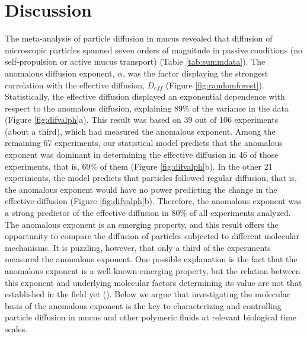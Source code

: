 \documentclass[aps,prl,preprint,superscriptaddress,showkeys,linenumbers]{revtex4-1}
\begin{document}
\section*{Discussion}
The meta-analysis of particle diffusion in mucus revealed that diffusion of microscopic particles spanned seven orders of magnitude in passive conditions (no self-propulsion or active mucus transport) (Table \ref{tab:summdata}). The anomalous diffusion exponent, $\alpha$, was the \textcolor{Antonio}{factor displaying the strongest correlation with} the effective diffusion, $D_{eff}$ (Figure \ref{fig:randomforest}). Statistically, the effective diffusion displayed an exponential dependence with respect to the anomalous diffusion, explaining 89\% of the variance in the data (Figure \ref{fig:difvalph}a). \textcolor{Antonio}{This result was based on 39 out of 106 experiments (about a third), which had measured the anomalous exponent. Among the remaining 67 experiments, our statistical model predicts that the anomalous exponent was dominant in determining the effective diffusion in 46 of those experiments, that is, 69\% of them (Figure \ref{fig:difvalph}b). In the other 21 experiments, the model predicts that particles followed regular diffusion, that is, the anomalous exponent would have no power predicting the change in the effective diffusion (Figure \ref{fig:difvalph}b). Therefore, the anomalous exponent was a strong predictor of the effective diffusion in 80\% of all experiments analyzed. The anomalous exponent is an emerging property, and this result offers the opportunity to compare the diffusion of particles subjected to different molecular mechanisms. It is puzzling, however, that only a third of the experiments measured the anomalous exponent. One possible explanation is the fact that the anomalous exponent is a well-known emerging property, but the relation between this exponent and underlying molecular factors determining its value are not that established in the field yet (\cite{McGlynn2020JAP}). Below we argue that investigating the molecular basis of the anomalous exponent is the key to characterizing and controlling particle diffusion in mucus and other polymeric fluids at relevant biological time scales.}
\end{document}
